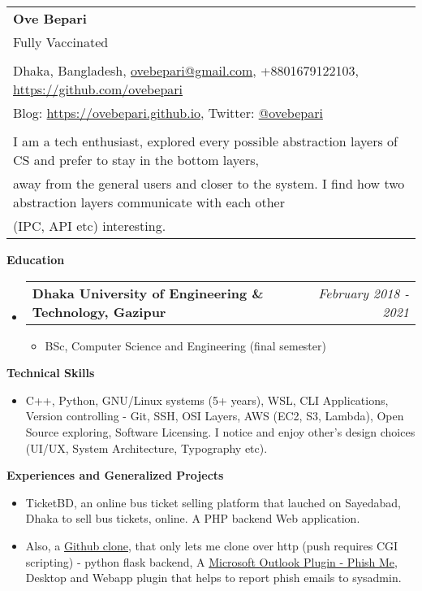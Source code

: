 \documentclass[letterpaper,10pt]{article}
\makeatletter
\newcommand{\resheading}[1]{{\large \colorbox{mygrey}{\begin{minipage}{\textwidth}{\textbf{#1 \vphantom{p\^{E}}}}\end{minipage}}}}
\newcommand{\ressubheading}[4]{
	\begin{tabular*}{7.1in}{l@{\extracolsep{\fill}}r}
		\textbf{#1} & \textit{#4} \\
	\end{tabular*}\vspace{-6pt}}
\makeatother
\begin{document}
	
	\begin{tabular*}{7.5in}{l@{\extracolsep{\fill}}}
		\textbf{\large Ove Bepari}\\
		{\scriptsize Fully Vaccinated}
		\\
		\\
		
		Dhaka, Bangladesh, \href{mailto:ovebepari@gmail.com}{ovebepari@gmail.com}, +8801679122103, \url{https://github.com/ovebepari} \\
		 Blog: \url{https://ovebepari.github.io}, Twitter: \href{https://twitter.com/ovebepari}{@ovebepari}
		\\
		\\
		I am a tech enthusiast, explored every possible abstraction layers of CS and prefer to stay in the bottom layers, \\away from the general users and closer to the system. I find how two abstraction layers communicate with each other\\ (IPC, API etc) interesting.
	\end{tabular*}
	
	\vspace{0.3in}
	
	\resheading{Education}
	\begin{itemize}
	
		\item \ressubheading{Dhaka University of Engineering \& Technology, Gazipur}{}{}{February 2018 - 2021}
		\begin{itemize}
			\item BSc, Computer Science and Engineering (final semester)
		\end{itemize}
	
	\end{itemize}
	
	\vspace{0.2in}
	
	\resheading{Technical Skills}
	\begin{itemize}
		\item C++, Python, GNU/Linux systems (5+ years), WSL, CLI Applications, Version controlling - Git, SSH, OSI Layers, AWS (EC2, S3, Lambda), Open Source exploring, Software Licensing. I notice and enjoy other's design choices (UI/UX, System Architecture, Typography etc).
	\end{itemize}

	\vspace{0.2in}
	
	\resheading{Experiences and Generalized Projects}
	\begin{itemize}
		\item TicketBD, an online bus ticket selling platform that lauched on Sayedabad, Dhaka to sell bus tickets, online. A PHP backend Web application.
		\item Also, a \href{https://ovebepari.github.io/linux\%7Csystems/i-made-my-own-github-not-really/}{Github clone}, that only lets me clone over http (push requires CGI scripting) - python flask backend, A \href{https://github.com/ovebepari/PhishMe}{Microsoft Outlook Plugin - Phish Me}, Desktop and Webapp plugin that helps to report phish emails to sysadmin.
	\end{itemize}
\end{document}
